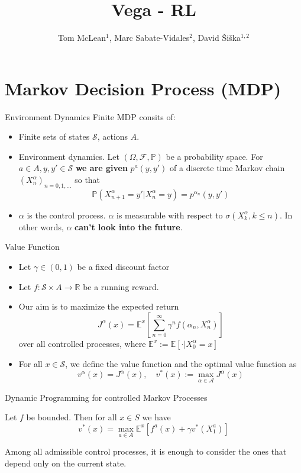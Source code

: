 \documentclass[usenames,handout,aspectratio=169]{beamer}
\title[RL]{Vega - RL}
\subtitle{}
\author{Tom McLean$^1$, Marc Sabate-Vidales$^2$, David \v{S}i\v{s}ka$^{1,2}$}
\institute{The University of Edinburgh$^1$ and Vega Protocol$^2$}
\begin{document}
\begin{frame}
\titlepage
\end{frame}


\section{Markov Decision Process (MDP)}
\begin{frame}{Environment Dynamics}
Finite MDP consits of:
\begin{itemize}
\item Finite sets of states $\mathcal S$, actions $A$. %
\item Environment dynamics. Let $(\Omega, \mathcal F, \mathbb P)$ be a probability space. For $a\in A, y,y'\in \mathcal S$ \textbf{we are given} $p^a(y,y')$ of a discrete time Markov chain $(X_n^\alpha )_{n=0,1,\ldots}$ so that 
\[
\mathbb P(X^\alpha_{n+1} = y' | X_n^\alpha = y) = p^{\alpha_n}(y,y')
\]	
\item $\alpha$ is the control process. $\alpha$ is measurable with respect to $\sigma(X^\alpha_k, k\leq n)$. In other words, $\alpha$ \textbf{can't look into the future}. 
\end{itemize}

\end{frame}

\begin{frame}{Value Function}
\begin{itemize}
	\item Let $\gamma \in(0,1)$ be a fixed discount factor
	\item Let $f: \mathcal S \times A \rightarrow \mathbb R$ be a running reward.%
	\item Our aim is to maximize the expected return
	\[
	J^\alpha(x) = \mathbb E^x \left [ \sum_{n=0}^\infty \gamma^n f(\alpha_n, X_n^\alpha)\right]
	\]
	over all controlled processes, where $\mathbb E^x := \mathbb E[\cdot |X_0^\alpha = x]$ 
	\item For all $x\in \mathcal S$, we define the value function and the optimal value function as
	\[
	v^\alpha(x) = J^\alpha(x), \quad v^*(x) := \max_{\alpha \in \mathcal A} J^\alpha(x) 
	\]
\end{itemize}
\end{frame}

\begin{frame}{Dynamic Programming for controlled Markov Processes}

\begin{Theorem}[DPP]\label{thm:dpp}
	Let $f$ be bounded. Then for all $x\in S$ we have 
	\[
	v^*(x) = \max_{a\in A} \mathbb E^x \left[f^a(x) + \gamma v^*(X_1^a) \right]
	\]
\end{Theorem}
\begin{Corollary}
	Among all admissible control processes, it is enough to consider the ones that depend only on the current state.
\end{Corollary}
\end{frame}
\end{document}
